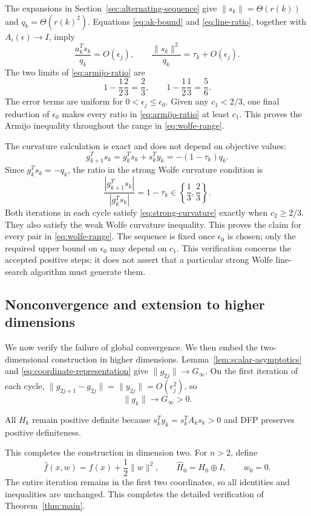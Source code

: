 \documentclass[11pt]{article}
\begin{document}
The expansions in Section~\ref{sec:alternating-sequence} give
$\|s_k\|=\Theta(r(k))$ and
$q_k=\Theta(r(k)^2)$.  Equations \eqref{eq:ak-bound} and
\eqref{eq:line-ratio}, together with $A_i(\epsilon)\to I$, imply
\[
\frac{a_k^Ts_k}{q_k}=O(\epsilon_j),
\qquad
\frac{\|s_k\|^2}{q_k}=\tau_k+O(\epsilon_j).
\]
The two limits of \eqref{eq:armijo-ratio} are
\[
1-\frac12\frac23=\frac23,
\qquad
1-\frac12\frac13=\frac56.
\]
The error terms are uniform for $0<\epsilon_j\le\epsilon_0$.  Given any
$c_1<2/3$, one final reduction of $\epsilon_0$ makes every ratio in
\eqref{eq:armijo-ratio} at least $c_1$.  This proves the Armijo inequality
throughout the range in \eqref{eq:wolfe-range}.


The curvature calculation is exact and does not depend on objective values:
\[
g_{k+1}^Ts_k=g_k^Ts_k+s_k^Ty_k
=-(1-\tau_k)q_k.
\]
Since $g_k^Ts_k=-q_k$, the ratio in the strong Wolfe curvature condition is
\[
\frac{|g_{k+1}^Ts_k|}{|g_k^Ts_k|}=1-\tau_k
\in\left\{\frac13,\frac23\right\}.
\]
Both iterations in each cycle satisfy \eqref{eq:strong-curvature} exactly when
$c_2\ge2/3$.  They also satisfy the weak Wolfe curvature inequality.  This
proves the claim for every pair in \eqref{eq:wolfe-range}.  The sequence is fixed once
$\epsilon_0$ is chosen; only the required upper bound on $\epsilon_0$ may
depend on $c_1$.  This verification concerns the accepted positive steps; it
does not assert that a particular strong Wolfe line-search algorithm must
generate them.


\subsection{Nonconvergence and extension to higher dimensions}

We now verify the failure of global convergence.  We then embed the
two-dimensional construction in higher dimensions.
Lemma~\ref{lem:scalar-asymptotics} and
\eqref{eq:coordinate-representation} give $\|g_{2j}\|\to G_\infty$.  On the
first iteration of each cycle,
$\|g_{2j+1}-g_{2j}\|=\|y_{2j}\|=O(\epsilon_j^2)$, so
\[
\|g_k\|\longrightarrow G_\infty>0.
\]

All $H_k$ remain positive definite because $s_k^Ty_k=s_k^TA_ks_k>0$ and
DFP preserves positive definiteness.

This completes the construction in dimension two.  For $n>2$, define
\[
\widehat f(x,w)=f(x)+\frac12\|w\|^2,
\qquad
\widehat H_0=H_0\oplus I,
\qquad w_0=0.
\]
The entire iteration remains in the first two coordinates, so all identities
and inequalities are unchanged.  This completes the detailed verification of Theorem~\ref{thm:main}.
\end{document}
